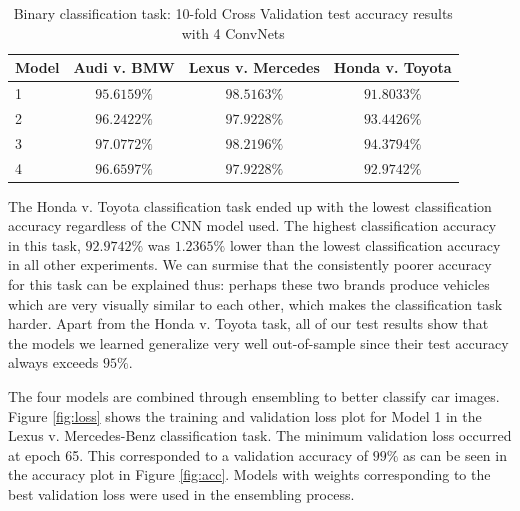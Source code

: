 \documentclass[conference]{IEEEtran}
\begin{document}
\begin{table}[t]
	\caption{Binary classification task: 10-fold Cross Validation test accuracy results with 4 ConvNets} \label{table:bin:kfold}
	\centering
\begin{tabular}{| l | c| c| c|}
\hline
\textbf{Model} & \textbf{Audi v. BMW} & \textbf{Lexus v. Mercedes}  &  \textbf{Honda v. Toyota}\\
\hline \hline
1 &  $95.6159\%$ &  $\bm{98.5163\%}$ &  $91.8033\%$ \\ \hline
2 &  $96.2422\%$ &  $97.9228\%$ &  $93.4426\%$ \\ \hline
3 &  $\bm{97.0772\%}$ &  $98.2196\%$ &  $\bm{94.3794\%}$ \\ \hline
4 &  $96.6597\%$ &  $97.9228\%$ &  $92.9742\%$ \\ \hline
\end{tabular}
\end{table}

The Honda v. Toyota classification task ended up with the lowest classification accuracy regardless of the CNN model used. The highest classification accuracy in this task, $92.9742\%$ was $1.2365\%$ lower than the lowest classification accuracy in all other experiments. We can surmise that the consistently poorer accuracy for this task can be explained thus: perhaps these two brands produce vehicles which are very visually similar to each other, which makes the classification task harder. Apart from the Honda v. Toyota task, all of our test results show that the models we learned generalize very well out-of-sample since their test accuracy always exceeds $95\%$.

The four models are combined through ensembling to better classify car images. Figure \ref{fig:loss} shows the training and validation loss plot for Model 1 in the Lexus v. Mercedes-Benz classification task. The minimum validation loss occurred at epoch 65. This corresponded to a validation accuracy of $99\%$ as can be seen in the accuracy plot in Figure \ref{fig:acc}. Models with weights corresponding to the best validation loss were used in the ensembling process.
\end{document}
